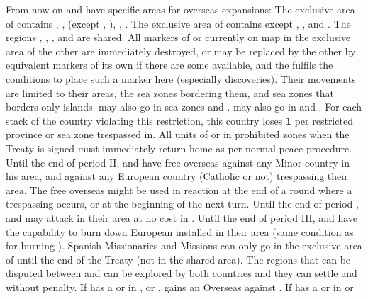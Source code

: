 \effetlong
\aparag From now on \SPA and \POR have specific areas for overseas expansions:
\bparag The exclusive area of \POR contains ,
\continentSiberia, \continentAsia (except \granderegionPhilippines,
), \continentAfrica, \continentBrazil.
\bparag The exclusive area of \SPA contains \continentAmerica except
\continentBrazil, \granderegionAmazonia, and .
\bparag The regions \granderegionAmazonia, ,
\granderegionPhilippines, and  are shared.
\bparag All markers of \SPA or \POR currently on map in the exclusive area of
the other \MAJ are immediately destroyed, or may be replaced by the other \MAJ
by equivalent markers of its own if there are some available, and the \MAJ
fulfils the conditions to place such a marker here (especially discoveries).
\bparag Their movements are limited to their areas, the sea zones bordering
them, and sea zones that borders only islands. \POR may also go in sea zones
 and . \SPA may also go in
 and .
\bparag For each stack of the country violating this restriction, this country
loses {\bf 1} \STAB per restricted province or sea zone trespassed in. All
units of \SPA or \POR in prohibited zones when the Treaty is signed must
immediately return home as per normal peace procedure.
\bparag Until the end of period II, \SPA and \POR have free overseas
 against any Minor country in his area, and against any European
country (Catholic or not) trespassing their area. The free overseas 
might be used in reaction at the end of a round where a trespassing occurs, or
at the beginning of the next turn.
\bparag Until the end of period , \SPA and \POR may attack
 in their area at no cost in \STAB.
\bparag Until the end of period III, \SPA and \POR have the capability to burn
down European \COL installed in their area (same condition as for burning
\TP).
\bparag Spanish Missionaries and Missions can only go in the exclusive area of
\SPA until the end of the Treaty (not in the shared area).
\bparag The regions that can be disputed between \POR and \SPA can be explored
by both countries and they can settle \COL and \TP without penalty.
\bparag If \POR has a \TP or \COL in \granderegionPhilippines,
\granderegionAmazonia or , \SPA gains an Overseas
\CB against \POR.
\bparag If \SPA has a \TP or \COL in \granderegionPhilippines or
